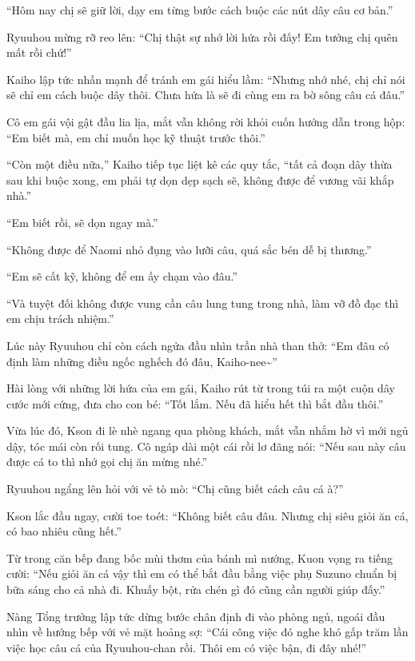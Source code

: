 ﻿\documentclass[../main.tex]{subfiles}
\begin{document}
``Hôm nay chị sẽ giữ lời, dạy em từng bước cách buộc các nút dây câu cơ bản.''

Ryuuhou mừng rỡ reo lên: ``Chị thật sự nhớ lời hứa rồi đấy! Em tưởng chị quên mất rồi chứ!''

Kaiho lập tức nhấn mạnh để tránh em gái hiểu lầm: ``Nhưng nhớ nhé, chị chỉ nói sẽ chỉ em cách buộc dây thôi. Chưa hứa là sẽ đi cùng em ra bờ sông câu cá đâu.''

Cô em gái vội gật đầu lia lịa, mắt vẫn không rời khỏi cuốn hướng dẫn trong hộp: ``Em biết mà, em chỉ muốn học kỹ thuật trước thôi.''

``Còn một điều nữa,'' Kaiho tiếp tục liệt kê các quy tắc, ``tất cả đoạn dây thừa sau khi buộc xong, em phải tự dọn dẹp sạch sẽ, không được để vương vãi khắp nhà.''

``Em biết rồi, sẽ dọn ngay mà.''

``Không được để Naomi nhỏ đụng vào lưỡi câu, quá sắc bén dễ bị thương.''

``Em sẽ cất kỹ, không để em ấy chạm vào đâu.''

``Và tuyệt đối không được vung cần câu lung tung trong nhà, làm vỡ đồ đạc thì em chịu trách nhiệm.''

Lúc này Ryuuhou chỉ còn cách ngửa đầu nhìn trần nhà than thở: ``Em đâu có định làm những điều ngốc nghếch đó đâu, Kaiho-nee\~{}''

Hài lòng với những lời hứa của em gái, Kaiho rút từ trong túi ra một cuộn dây cước mới cứng, đưa cho con bé: ``Tốt lắm. Nếu đã hiểu hết thì bắt đầu thôi.''

Vừa lúc đó, Kson đi lè nhè ngang qua phòng khách, mắt vẫn nhắm hờ vì mới ngủ dậy, tóc mái còn rối tung. Cô ngáp dài một cái rồi lơ đãng nói: ``Nếu sau này câu được cá to thì nhớ gọi chị ăn mừng nhé.''

Ryuuhou ngẩng lên hỏi với vẻ tò mò: ``Chị cũng biết cách câu cá à?''

Kson lắc đầu ngay, cười toe toét: ``Không biết câu đâu. Nhưng chị siêu giỏi ăn cá, có bao nhiêu cũng hết.''

Từ trong căn bếp đang bốc mùi thơm của bánh mì nướng, Kuon vọng ra tiếng cười: ``Nếu giỏi ăn cá vậy thì em có thể bắt đầu bằng việc phụ Suzuno chuẩn bị bữa sáng cho cả nhà đi. Khuấy bột, rửa chén gì đó cũng cần người giúp đấy.''

Nàng Tổng trưởng lập tức dừng bước chân định đi vào phòng ngủ, ngoái đầu nhìn về hướng bếp với vẻ mặt hoảng sợ: ``Cái công việc đó nghe khó gấp trăm lần việc học câu cá của Ryuuhou-chan rồi. Thôi em có việc bận, đi đây nhé!''
\end{document}
